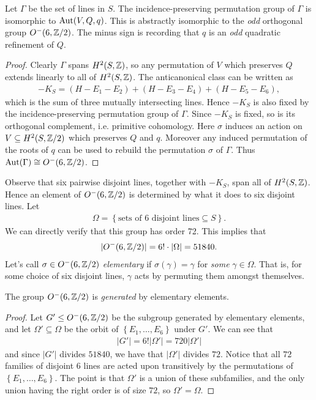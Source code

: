 \documentclass[11pt]{amsart}
\begin{document}
\begin{proposition} Let $\Gamma$ be the set of lines in $S$. The incidence-preserving permutation group of $\Gamma$ is isomorphic to $\mathrm{Aut}(V,Q,q)$. This is abstractly isomorphic to the \textit{odd} orthogonal group $O^-(6,\mathbb{Z}/2)$. The minus sign is recording that $q$ is an \textit{odd} quadratic refinement of $Q$.
\end{proposition}
\begin{proof} Clearly $\Gamma$ spans $H^2(S,\mathbb{Z})$, so any permutation of $V$ which preserves $Q$ extends linearly to all of $H^2(S,\mathbb{Z})$. The anticanonical class can be written as
\begin{align*}
    -K_S = (H - E_1 - E_2) + (H - E_3 - E_4) + (H - E_5 - E_6),
\end{align*}
which is the sum of three mutually intersecting lines. Hence $-K_S$ is also fixed by the incidence-preserving permutation group of $\Gamma$. Since $-K_S$ is fixed, so is its orthogonal complement, i.e. primitive cohomology. Here $\sigma$ induces an action on $V \subseteq H^2(S,\mathbb{Z}/2)$ which preserves $Q$ and $q$. Moreover any induced permutation of the roots of $q$ can be used to rebuild the permutation $\sigma$ of $\Gamma$. Thus $\mathrm{Aut}(\Gamma) \cong O^-(6,\mathbb{Z}/2)$.
\end{proof}

Observe that six pairwise disjoint lines, together with $-K_S$, span all of $H^2(S,\mathbb{Z})$. Hence an element of $O^-(6,\mathbb{Z}/2)$ is determined by what it does to six disjoint lines. Let
\begin{align*}
    \Omega = \left\{ \text{sets of }6\text{ disjoint lines} \subseteq S \right\}.
\end{align*}
We can directly verify that this group has order 72. This implies that
\begin{align*}
    |O^-(6,\mathbb{Z}/2)| = 6! \cdot |\Omega| = 51840.
\end{align*}
%
Let's call $\sigma\in O^-(6,\mathbb{Z}/2)$ \textit{elementary} if $\sigma(\gamma) = \gamma$ for \textit{some} $\gamma\in \Omega$. That is, for some choice of six disjoint lines, $\gamma$ acts by permuting them amongst themselves.

\begin{proposition} The group $O^-(6,\mathbb{Z}/2)$ is \textit{generated} by elementary elements.
\end{proposition}
\begin{proof} Let $G' \le O^-(6,\mathbb{Z}/2)$ be the subgroup generated by elementary elements, and let $\Omega' \subseteq \Omega$ be the orbit of $\left\{ E_1, \ldots, E_6 \right\}$ under $G'$. We can see that
\begin{align*}
    |G'| = 6! |\Omega'| = 720|\Omega'|
\end{align*}
and since $|G'|$ divides $51840$, we have that $|\Omega'|$ divides $72$. Notice that all $72$ families of disjoint $6$ lines are acted upon transitively by the permutations of $\left\{ E_1, \ldots, E_6 \right\}$. The point is that $\Omega'$ is a union of these subfamilies, and the only union having the right order is of size $72$, so $\Omega' = \Omega$.
\end{proof}
\end{document}
